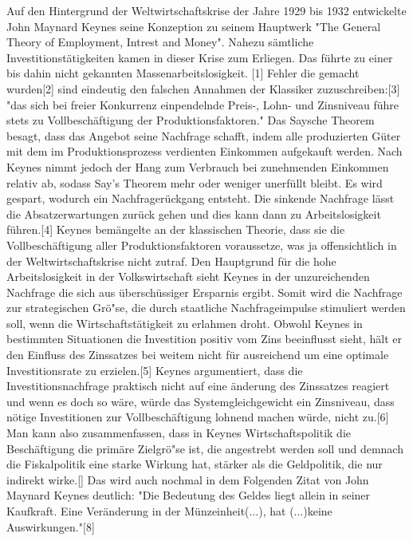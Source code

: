 Auf den Hintergrund der Weltwirtschaftskrise der Jahre 1929 bis 1932 entwickelte
John Maynard Keynes seine Konzeption zu seinem Hauptwerk "The General Theory of
Employment, Intrest and Money". Nahezu s{\"a}mtliche Investitionst{\"a}tigkeiten kamen
in dieser Krise zum Erliegen. Das f{\"u}hrte zu einer bis dahin nicht gekannten
Massenarbeitslosigkeit. [1] Fehler die gemacht wurden[2] sind eindeutig den falschen
Annahmen der Klassiker zuzuschreiben:[3] "das sich bei freier Konkurrenz
einpendelnde Preis-, Lohn- und Zinsniveau f{\"u}hre stets zu Vollbesch{\"a}ftigung der
Produktionsfaktoren." Das Saysche Theorem besagt, dass das Angebot seine Nachfrage
schafft, indem alle produzierten G{\"u}ter mit dem im Produktionsprozess verdienten
Einkommen aufgekauft werden. Nach Keynes nimmt jedoch der Hang zum Verbrauch bei
zunehmenden Einkommen relativ ab, sodass Say's Theorem mehr oder weniger unerf{\"u}llt
bleibt. Es wird gespart, wodurch ein Nachfrager{\"u}ckgang entsteht. Die sinkende
Nachfrage l{\"a}sst die Absatzerwartungen zur{\"u}ck gehen und dies kann dann zu
Arbeitslosigkeit f{\"u}hren.[4] Keynes bem{\"a}ngelte an der klassischen Theorie, dass sie die
Vollbesch{\"a}ftigung aller Produktionsfaktoren voraussetze, was ja offensichtlich in
der Weltwirtschaftskrise nicht zutraf. Den Hauptgrund f{\"u}r die hohe Arbeitslosigkeit
in der Volkswirtschaft sieht Keynes in der unzureichenden Nachfrage die sich aus
{\"u}bersch{\"u}ssiger Ersparnis ergibt. Somit wird die Nachfrage zur strategischen Gr{\"o}{"s}e,
die durch staatliche Nachfrageimpulse stimuliert werden soll, wenn die
Wirtschaftst{\"a}tigkeit zu erlahmen droht. Obwohl Keynes in bestimmten Situationen die
Investition positiv vom Zins beeinflusst sieht, h{\"a}lt er den Einfluss des Zinssatzes
bei weitem nicht f{\"u}r ausreichend um eine optimale Investitionsrate zu erzielen.[5]
Keynes argumentiert, dass die Investitionsnachfrage praktisch nicht auf eine
{\"a}nderung des Zinssatzes reagiert und wenn es doch so w{\"a}re, w{\"u}rde das Systemgleichgewicht
ein Zinsniveau, dass n{\"o}tige Investitionen zur Vollbesch{\"a}ftigung lohnend machen w{\"u}rde,
nicht zu.[6]
Man kann also zusammenfassen, dass in Keynes Wirtschaftspolitik die Besch{\"a}ftigung
die prim{\"a}re Zielgr{\"o}{"s}e ist, die angestrebt werden soll und demnach die Fiskalpolitik
eine starke Wirkung hat, st{\"a}rker als die Geldpolitik, die nur indirekt wirke.[]
Das wird auch nochmal in dem Folgenden Zitat von John Maynard Keynes deutlich:
"Die Bedeutung des Geldes liegt allein in seiner Kaufkraft. Eine Ver{\"a}nderung in der
M{\"u}nzeinheit(...), hat (...)keine Auswirkungen."[8]




